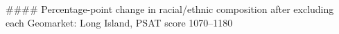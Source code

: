 #### Percentage-point change in racial/ethnic composition after excluding each Geomarket: Long Island, PSAT score 1070–1180
